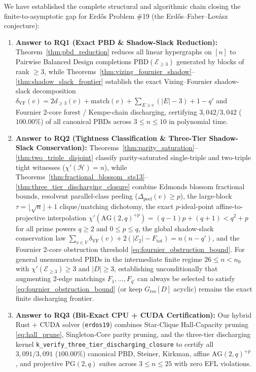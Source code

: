\documentclass[11pt,reqno]{amsart}
\theoremstyle{definition}
\theoremstyle{remark}
\begin{document}
We have established the complete structural and algorithmic chain closing the finite-to-asymptotic gap for Erd\H{o}s Problem \#19 (the Erd\H{o}s--Faber--Lov\'asz conjecture):
\begin{enumerate}
  \item \textbf{Answer to RQ1 (Exact PBD \& Shadow-Slack Reduction):} Theorem~\ref{thm:pbd_reduction} reduces all linear hypergraphs on $[n]$ to Pairwise Balanced Design completions $\mathrm{PBD}(\mathcal{E}_{\ge 3})$ generated by blocks of rank $\ge 3$, while Theorems~\ref{thm:vizing_fournier_shadow}--\ref{thm:shadow_slack_frontier} establish the exact Vizing--Fournier shadow-slack decomposition $\delta_{\mathrm{VF}}(v) = 2 d_{\ge 3}(v) + \mathrm{match}(v) + \sum_{E \ni v}(|E| - 3) + 1 - q'$ and Fournier 2-core forest / Kempe-chain discharging, certifying $3{,}042 / 3{,}042$ ($100.00\%$) of all canonical PBDs across $3 \le n \le 10$ in polynomial time.
  \item \textbf{Answer to RQ2 (Tightness Classification \& Three-Tier Shadow-Slack Conservation):} Theorems~\ref{thm:parity_saturation}--\ref{thm:two_triple_disjoint} classify parity-saturated single-triple and two-triple tight witnesses ($\chi'(\mathcal{H}) = n$), while Theorems~\ref{thm:fractional_blossom_sts13}--\ref{thm:three_tier_discharging_closure} combine Edmonds blossom fractional bounds, resolvent parallel-class peeling ($\Delta_{\mathrm{peel}}(v) \ge p$), the large-block $\tau = \lfloor\sqrt{n}\rfloor + 1$ clique/matching dichotomy, the exact $p$-ideal-point affine-to-projective interpolation $\chi'(\mathrm{AG}(2,q)^{+p}) = (q-1)p + (q+1) < q^2 + p$ for all prime powers $q \ge 2$ and $0 \le p \le q$, the global shadow-slack conservation law $\sum_{v \in V} \delta_{\mathrm{VF}}(v) + 2(|\mathcal{E}_2| - F_{\mathrm{tot}}) = n(n - q')$, and the Fournier 2-core obstruction threshold \eqref{eq:fournier_obstruction_bound}. For general unenumerated PBDs in the intermediate finite regime $26 \le n < n_0$ with $\chi'(\mathcal{E}_{\ge 3}) \ge 3$ and $|D| \ge 3$, establishing unconditionally that augmenting $2$-edge matchings $F_1, \dots, F_{q'}$ can always be selected to satisfy \eqref{eq:fournier_obstruction_bound} (or keep $G_{\mathrm{res}}[D]$ acyclic) remains the exact finite discharging frontier.
  \item \textbf{Answer to RQ3 (Bit-Exact CPU + CUDA Certification):} Our hybrid Rust + CUDA solver (\texttt{erdos19}) combines Star-Clique Hall-Capacity pruning \eqref{eq:hall_prune}, Singleton-Core parity pruning, and the three-tier discharging kernel \texttt{k\_\allowbreak verify\_\allowbreak three\_\allowbreak tier\_\allowbreak discharging\_\allowbreak closure} to certify all $3{,}091 / 3{,}091$ ($100.00\%$) canonical PBD, Steiner, Kirkman, affine $\mathrm{AG}(2,q)^{+p}$, and projective $\mathrm{PG}(2,q)$ suites across $3 \le n \le 25$ with zero EFL violations.
\end{enumerate}
\end{document}
